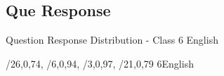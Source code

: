 \label{4.3 C6E Question Response Distribution}
\subsection{Que Response}
\renewcommand{\insertclass}{- Class 6}
\renewcommand{\insertsubject}{ - English}
\begin{frame}{Question Response Distribution - Class 6 English}
\vspace{-3mm}
\begin{minipage}{0.45\paperwidth}
{/{26,0,74},
/{6,0,94},
/{3,0,97},
/{21,0,79}}
{6}{English}
    \end{minipage}%
    \begin{minipage}{0.05\paperwidth}
        \hfill 
    \end{minipage}%
    \begin{minipage}{0.45\paperwidth}
    \queresponselegend
    \end{minipage}
\end{frame}
%



